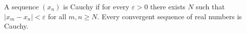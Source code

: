 A sequence $(x_{n})$ is Cauchy if for every $\varepsilon > 0$ there exists $N$ such that $\lvert x_{m} - x_{n} \rvert < \varepsilon$ for all $m, n \geq N$.
Every convergent sequence of real numbers is Cauchy.